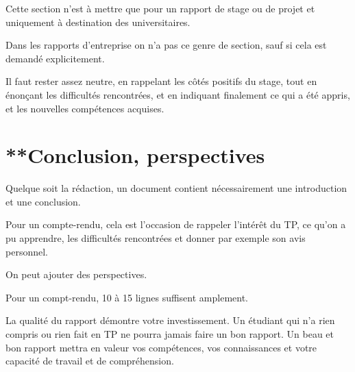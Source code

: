 Cette section n'est à mettre que pour un rapport de stage ou de projet
et uniquement à destination des universitaires.

Dans les rapports d'entreprise on n'a pas ce genre de section, sauf si cela
est demandé explicitement.

Il faut rester assez neutre, en rappelant les côtés positifs du stage, tout en 
énonçant les difficultés rencontrées, et en indiquant finalement 
ce qui a été appris, et les nouvelles compétences acquises.



\section{**Conclusion, perspectives}

Quelque soit la rédaction, un document contient nécessairement une introduction et une conclusion.

Pour un compte-rendu, cela est l'occasion de rappeler l'intérêt du TP, ce qu'on a pu apprendre, les difficultés rencontrées et donner par exemple son avis personnel.

On peut ajouter des perspectives.

Pour un compt-rendu,   10 à 15 lignes suffisent amplement.


\vspace{1cm} 
 
La qualité du rapport démontre votre investissement. Un étudiant qui n'a rien compris ou rien fait en TP ne pourra jamais faire un bon rapport. 
Un beau et bon rapport mettra en valeur vos compétences, vos connaissances 
et votre capacité de travail et de compréhension. 
 
